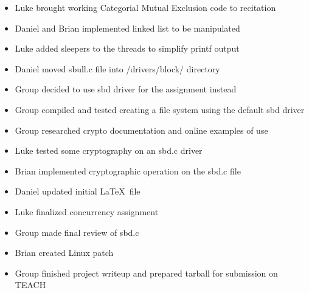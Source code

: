 \documentclass[10pt,letterpaper,draftclsnofoot,onecolumn]{IEEEtran}
\begin{document}
\begin{itemize}
\item Luke brought working Categorial Mutual Exclusion code to recitation
\item Daniel and Brian implemented linked list to be manipulated
\item Luke added sleepers to the threads to simplify printf output
\item Daniel moved sbull.c file into /drivers/block/ directory
\item Group decided to use sbd driver for the assignment instead
\item Group compiled and tested creating a file system using the default sbd driver
\item Group researched crypto documentation and online examples of use
\item Luke tested some cryptography on an sbd.c driver
\item Brian implemented cryptographic operation on the sbd.c file
\item Daniel updated initial \LaTeX\ file
\item Luke finalized concurrency assignment
\item Group made final review of sbd.c
\item Brian created Linux patch
\item Group finished project writeup and prepared tarball for submission on TEACH
\end{itemize}
\end{document}
